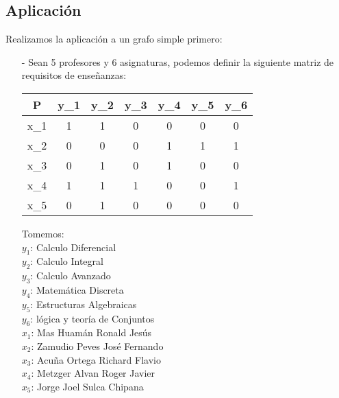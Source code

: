 \documentclass[letterpaper,12pt]{article}
\begin{document}
    \subsection{Aplicación}
    Realizamos la aplicación a un grafo simple primero:
    \begin{itemize}
        \item [-]Sean 5 profesores y 6 asignaturas, podemos definir la siguiente matriz de requisitos de enseñanzas:
        \begin{center}
        \begin{tabular}{|c|c|c|c|c|c|c|}
        \hline
        P & y_{1} & y_{2} & y_{3} & y_{4} & y_{5} & y_{6} \\
        \hline
        x_{1} & 1 & 1 & 0 & 0 & 0 & 0 \\
        \hline
        x_{2} & 0 & 0 & 0 & 1 & 1 & 1 \\
        \hline 
        x_{3} & 0 & 1 & 0 & 1 & 0 & 0 \\
        \hline 
        x_{4} & 1 & 1 & 1 & 0 & 0 & 1 \\
        \hline
        x_{5} & 0 & 1 & 0 & 0 & 0 & 0 \\
        \hline     
        \end{tabular}
        \end{center}
        Tomemos: \\
        $y_{1}$: Calculo Diferencial \\
        $y_{2}$: Calculo Integral \\
        $y_{3}$: Calculo Avanzado \\
        $y_{4}$: Matemática Discreta \\
        $y_{5}$: Estructuras Algebraicas \\
        $y_{6}$: lógica y teoría de Conjuntos \\
        $x_{1}$: Mas Huamán Ronald Jesús \\
        $x_{2}$: Zamudio Peves José Fernando \\
        $x_{3}$: Acuña Ortega Richard Flavio \\
        $x_{4}$: Metzger Alvan Roger Javier \\
        $x_{5}$: Jorge Joel Sulca Chipana 
        

\end{itemize}
\end{document}

